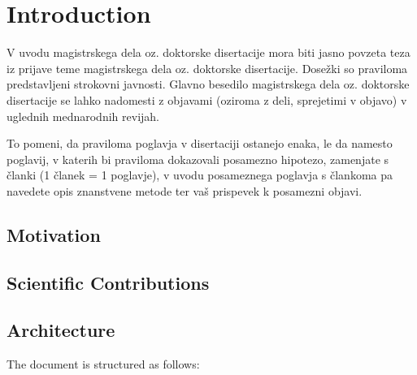 % 
\chapter{Introduction}
\label{ch:introduction}

V uvodu magistrskega dela oz. doktorske disertacije mora biti jasno povzeta teza iz prijave teme magistrskega dela oz. doktorske disertacije. Dosežki so praviloma predstavljeni strokovni javnosti. Glavno besedilo magistrskega dela oz. doktorske disertacije se lahko nadomesti z objavami (oziroma z deli, sprejetimi v objavo) v uglednih mednarodnih revijah.

To pomeni, da praviloma poglavja v disertaciji ostanejo enaka, le da namesto poglavij, v katerih bi praviloma dokazovali posamezno hipotezo, zamenjate s članki (1 članek = 1 poglavje), v uvodu posameznega poglavja s člankoma pa navedete opis znanstvene metode ter vaš prispevek k posamezni objavi.

\section{Motivation}

\section{Scientific Contributions}

\section{Architecture}


The document is structured as follows: 